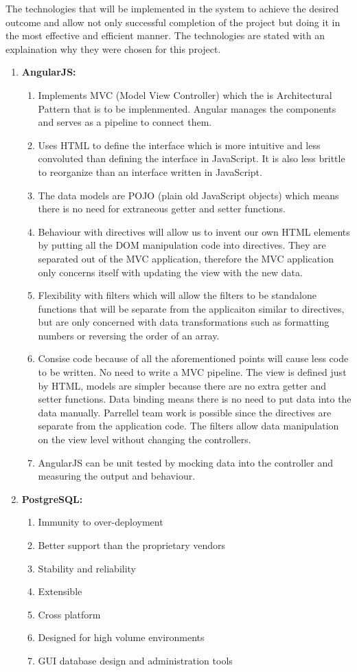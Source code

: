 The technologies that will be implemented in the system to achieve the desired outcome and allow not only successful completion of the project but doing it in the most 					effective and efficient manner. The technologies are stated with an explaination why they were chosen for this project.
	\begin{enumerate}
		\item \textbf{AngularJS:} 
		\begin{enumerate}
			\item Implements MVC (Model View Controller) which the is Architectural Pattern that is to be implenmented. Angular manages the components 									and serves as a pipeline to connect them.
			\item Uses HTML to define the interface which is more intuitive and less convoluted than defining the interface in JavaScript. It is also less brittle to 								reorganize than an interface written in JavaScript.
			\item The data models are POJO (plain old JavaScript objects) which means there is no need for extraneous getter and setter functions.
			\item Behaviour with directives will allow us to invent our own HTML elements by putting all the DOM manipulation code into directives. They are 									separated out of the MVC application, therefore the MVC application only concerns itself with updating the view with the new data.
			\item Flexibility with filters which will allow the filters to be standalone functions that will be separate from the applicaiton similar to directives, but are only concerned with data transformations such as formatting numbers or reversing the order of an array.
			\item Consise code because of all the aforementioned points will cause less code to be written. No need to write a MVC pipeline. The view is defined just by HTML, models are simpler because there are no extra getter and setter functions. Data binding means there is no need to put data into the data manually. Parrellel team work is possible since the directives are separate from the application code. The filters allow data manipulation on the view level without changing the controllers.
			\item AngularJS can be unit tested by mocking data into the controller and measuring the output and behaviour.
		\end{enumerate}
		
		\item \textbf{PostgreSQL:}
		\begin{enumerate}
			\item Immunity to over-deployment 
			\item Better support than the proprietary vendors 
			\item Stability and reliability
			\item Extensible 
			\item Cross platform
			\item Designed for high volume environments
			\item GUI database design and administration tools
		\end{enumerate} 
		

\end{enumerate}
